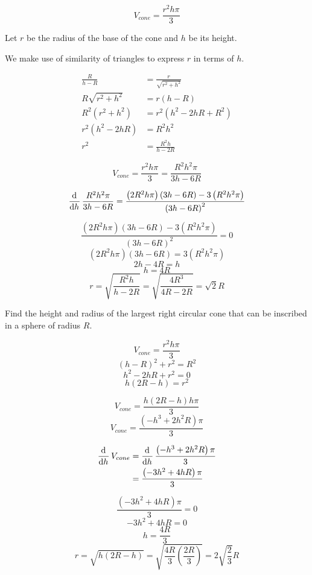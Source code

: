 \documentclass[a4paper, titlepage]{article}
\begin{document}
\begin{Answer}

\[V_{cone} = \frac{r^2 h \pi}{3}\]

Let \(r\) be the radius of the base of the cone and \(h\) be its height.

We make use of similarity of triangles to express \(r\) in terms of \(h\).

\begin{align*}
  \frac{R}{h - R} &= \frac{r}{\sqrt{r^2 + h^2}} \\
   R \sqrt{r^2 + h^2} &= r\left(h - R\right) \\
   R^2 \left( r^2 + h^2 \right) &= r^2 \left(h^2 - 2 h R + R^2\right) \\
   r^2 \left(h^2 - 2 h R\right) &= R^2 h^2 \\
   r^2 &= \frac{R^2 h}{h - 2 R}
\end{align*}

\[V_{cone} = \frac{r^2 h \pi}{3} = \frac{R^2 h^2 \pi}{3 h - 6 R} \]

\[\dod{}{h} \frac{R^2 h^2 \pi}{3 h - 6 R} =
  \frac{\left(2 R^2 h \pi \right) \left(3 h - 6 R \right) - 3 \left( R^2 h^2 \pi \right)}
       {\left( 3 h - 6 R \right)^2}\]

\[\frac{\left(2 R^2 h \pi \right) \left(3 h - 6 R \right) - 3 \left( R^2 h^2 \pi \right)}
       {\left( 3 h - 6 R \right)^2} = 0\]
\[\left(2 R^2 h \pi \right) \left(3 h - 6 R \right) = 3 \left( R^2 h^2 \pi \right)\]
\[2h - 4R = h\]
\[h = 4R\]
\[r = \sqrt{\frac{R^2 h}{h - 2R}} = \sqrt{\frac{4R^3}{4R - 2R}} = \sqrt{2} R\]
\end{Answer}

\begin{Exercise}
Find the height and radius of the largest right circular cone that can be inscribed in a sphere of radius \(R\).
\end{Exercise}
\begin{Answer}

\[V_{cone} = \frac{r^2 h \pi}{3}\]
\[\left(h - R \right)^2 + r^2 = R^2\]
\[h^2 - 2hR + r^2 = 0\]
\[h \left( 2R - h \right) = r^2\]

\[V_{cone} = \frac{h \left( 2R - h \right) h \pi}{3}\]
\[V_{cone} = \frac{\left( -h^3 + 2h^2R \right) \pi}{3}\]

\begin{align*}
    \dod{}{h} V_{cone} &= \dod{}{h} \frac{\left( -h^3 + 2h^2R \right) \pi}{3} \\
     &= \frac{\left( -3h^2 + 4hR \right) \pi}{3} \\
\end{align*}


\[\frac{\left( -3h^2 + 4hR \right) \pi}{3} = 0\]
\[-3h^2 + 4hR = 0\]
\[h = \frac{4R}{3}\]
\[r = \sqrt{h \left(2R - h\right)}
    = \sqrt{\frac{4R}{3} \left(\frac{2R}{3}\right)}
    = 2 \sqrt{\frac{2}{3}} R\]
\end{Answer}
\end{document}
